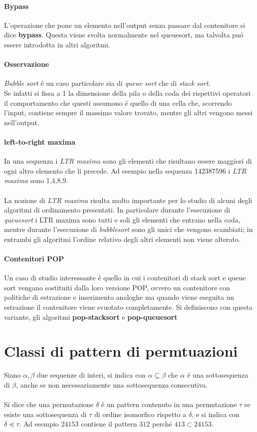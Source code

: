\paragraph*{Bypass} L'operazione che pone un elemento nell'output senza passare dal contenitore si dice \textbf{bypass}. Questa viene svolta normalmente nel queuesort, ma talvolta pu\'o essere introdotta in altri algoritmi.
\paragraph*{Osservazione}\textit{Bubble sort} \'e un caso particolare sia di \textit{queue sort} che di \textit{stack sort}.\\
Se infatti si fissa a 1 la dimensione della pila o della coda dei rispettivi operatori il comportamento che questi assumono \'e quello di una cella che, scorrendo l'input, contiene sempre il massimo valore trovato, mentre gli altri vengono messi nell'output.
\paragraph*{left-to-right maxima} In una sequenza i \textit{LTR maxima} sono gli elementi che risultano essere maggiori di ogni altro elemento che li precede. Ad esempio nella sequenza 142387596 i \textit{LTR maxima} sono 1,4,8,9.\\\\
La nozione di \textit{LTR maxima} risulta molto importante per lo studio di alcuni degli algoritmi di ordinamento presentati. In particolare durante l'esecuzione di \textit{queuesort} i LTR maxima sono tutti e soli gli elementi che entrano nella coda, mentre durante l'esecuzione di \textit{bubblesort} sono gli unici che vengono scambiati; in entrambi gli algoritmi l'ordine relativo degli altri elementi non viene alterato.
\paragraph*{Contenitori POP}Un caso di studio interessante \'e quello in cui i contenitori di stack sort e queue sort vengano sostituiti dalla loro versione POP, ovvero un contenitore con politiche di estrazione e inserimento analoghe ma quando viene eseguita un estrazione il contenitore viene svuotato completamente. Si definiscono con questa variante, gli algoritmi \textbf{pop-stacksort} e \textbf{pop-queuesort} 
\section*{Classi di pattern di permtuazioni}
\cite{bouvel2022preimages}
Siano $\alpha,\beta$ due sequenze di interi, si indica con $\alpha \subseteq \beta$ che $\alpha$ \'e una sottosequenza di $\beta$, anche se non necessariamente una sottosequenza consecutiva.\\\\
Si dice che una permutazione $\delta$ \'e un pattern contenuto in una permutazione $\tau$ se esiste una sottosequenza di $\tau$ di ordine isomorfico rispetto a $\delta$, e si indica con $\delta\preceq\tau$. Ad esempio $24153$ contiene il pattern $312$ perch\'e $413\subset{24153}$.
